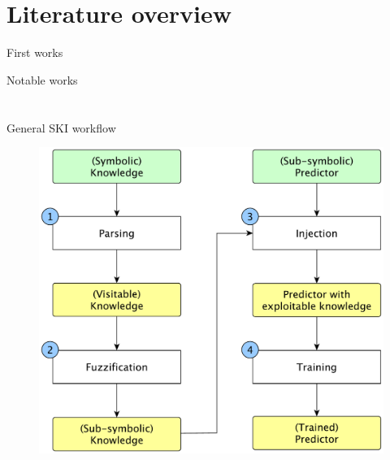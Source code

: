 \documentclass[presentation]{beamer}\mode<presentation>{\usetheme{AMSBolognaFC}}
\begin{document}
\section{Literature overview}

\begin{frame}[c]{First works}
\end{frame}


\begin{frame}[c]{Notable works}
\end{frame}

\section{\psyki}


\begin{frame}{General SKI workflow}
    
    \begin{figure}
        \centering
        \includegraphics[width=0.8\textheight]{figures/ski-workflow.pdf}
    \end{figure}
    
\end{frame}
\end{document}
